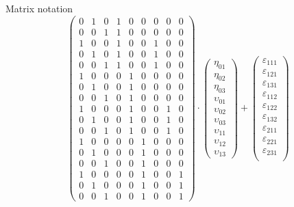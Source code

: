 \documentclass[aspectratio=169]{beamer}
\begin{document}
\begin{frame}{Matrix notation}
\begin{equation*}
\begin{pmatrix}
    0 & 1 & 0 & 1 & 0 & 0 & 0 & 0 & 0 \\
    0 & 0 & 1 & 1 & 0 & 0 & 0 & 0 & 0 \\
    1 & 0 & 0 & 1 & 0 & 0 & 1 & 0 & 0 \\
    0 & 1 & 0 & 1 & 0 & 0 & 1 & 0 & 0 \\
    0 & 0 & 1 & 1 & 0 & 0 & 1 & 0 & 0 \\
    1 & 0 & 0 & 0 & 1 & 0 & 0 & 0 & 0 \\
    0 & 1 & 0 & 0 & 1 & 0 & 0 & 0 & 0 \\
    0 & 0 & 1 & 0 & 1 & 0 & 0 & 0 & 0 \\
    1 & 0 & 0 & 0 & 1 & 0 & 0 & 1 & 0 \\
    0 & 1 & 0 & 0 & 1 & 0 & 0 & 1 & 0 \\
    0 & 0 & 1 & 0 & 1 & 0 & 0 & 1 & 0 \\
    1 & 0 & 0 & 0 & 0 & 1 & 0 & 0 & 0 \\
    0 & 1 & 0 & 0 & 0 & 1 & 0 & 0 & 0 \\
    0 & 0 & 1 & 0 & 0 & 1 & 0 & 0 & 0 \\
    1 & 0 & 0 & 0 & 0 & 1 & 0 & 0 & 1 \\
    0 & 1 & 0 & 0 & 0 & 1 & 0 & 0 & 1 \\
    0 & 0 & 1 & 0 & 0 & 1 & 0 & 0 & 1
  \end{pmatrix} \cdot
  \begin{pmatrix}
    \eta_{01} \\
    \eta_{02} \\
    \eta_{03} \\
    \upsilon_{01}\\
    \upsilon_{02} \\
    \upsilon_{03} \\
    \upsilon_{11}\\
    \upsilon_{12} \\
    \upsilon_{13}
  \end{pmatrix} +
  \begin{pmatrix}
    \varepsilon_{111} \\
    \varepsilon_{121} \\
    \varepsilon_{131} \\
    \varepsilon_{112} \\
    \varepsilon_{122} \\
    \varepsilon_{132} \\
    \varepsilon_{211} \\
    \varepsilon_{221} \\
    \varepsilon_{231} \\

\end{pmatrix}
\end{equation*}
\end{frame}
\end{document}
